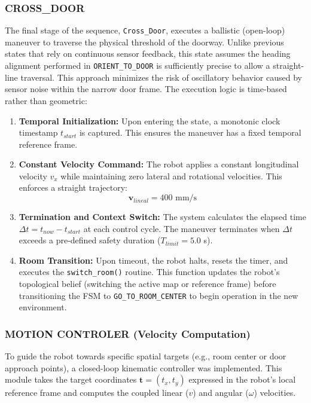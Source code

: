 \documentclass[conference]{IEEEtran}
\begin{document}
    \subsubsection{CROSS\_DOOR}
    The final stage of the sequence, \texttt{Cross\_Door}, executes a ballistic (open-loop) maneuver to traverse the physical threshold of the doorway. Unlike previous states that rely on continuous sensor feedback, this state assumes the heading alignment performed in \texttt{ORIENT\_TO\_DOOR} is sufficiently precise to allow a straight-line traversal. This approach minimizes the risk of oscillatory behavior caused by sensor noise within the narrow door frame.
    \vspace{0.5cm}
    The execution logic is time-based rather than geometric:
    \begin{enumerate}
        \item \textbf{Temporal Initialization:} Upon entering the state, a monotonic clock timestamp $t_{start}$ is captured. This ensures the maneuver has a fixed temporal reference frame.
        \item \textbf{Constant Velocity Command:} The robot applies a constant longitudinal velocity $v_{x}$ while maintaining zero lateral and rotational velocities. This enforces a straight trajectory:
        \begin{equation}
            \mathbf{v}_{lineal} = 400\text{ mm/s}
        \end{equation}
        \item \textbf{Termination and Context Switch:} The system calculates the elapsed time $\Delta t = t_{now} - t_{start}$ at each control cycle. The maneuver terminates when $\Delta t$ exceeds a pre-defined safety duration ($T_{limit} = 5.0$ s).
        \item \textbf{Room Transition:} Upon timeout, the robot halts, resets the timer, and executes the \texttt{switch\_room()} routine. This function updates the robot's topological belief (switching the active map or reference frame) before transitioning the FSM to \texttt{GO\_TO\_ROOM\_CENTER} to begin operation in the new environment.
    \end{enumerate}

    \subsubsection{MOTION CONTROLER (Velocity Computation)}
    To guide the robot towards specific spatial targets (e.g., room center or door approach points), a closed-loop kinematic controller was implemented. This module takes the target coordinates $\mathbf{t} = (t_x, t_y)$ expressed in the robot's local reference frame and computes the coupled linear ($v$) and angular ($\omega$) velocities.
    
\end{document}
